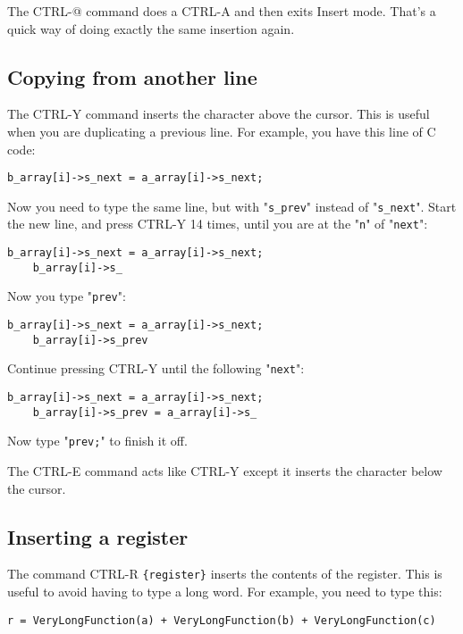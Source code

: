 The CTRL-@ command does a CTRL-A and then exits Insert mode.
That's a quick way of doing exactly the same insertion again.
\subsection{Copying from another line}
The CTRL-Y command inserts the character above the cursor.
This is useful when you are duplicating a previous line.
For example, you have this line of C code:

\begin{Verbatim}[samepage=true]
    b_array[i]->s_next = a_array[i]->s_next; 
\end{Verbatim}

Now you need to type the same line, but with "\verb!s_prev!" instead of "\verb!s_next!".
Start the new line, and press CTRL-Y 14 times, until you are at the "\verb!n!" of "\verb!next!":

\begin{Verbatim}[samepage=true]
    b_array[i]->s_next = a_array[i]->s_next; 
    b_array[i]->s_ 
\end{Verbatim}

Now you type "\verb!prev!":

\begin{Verbatim}[samepage=true]
    b_array[i]->s_next = a_array[i]->s_next; 
    b_array[i]->s_prev 
\end{Verbatim}

Continue pressing CTRL-Y until the following "\verb!next!":

\begin{Verbatim}[samepage=true]
    b_array[i]->s_next = a_array[i]->s_next; 
    b_array[i]->s_prev = a_array[i]->s_ 
\end{Verbatim}

Now type "\verb!prev;!" to finish it off.

The CTRL-E command acts like CTRL-Y except it inserts the character below the cursor.
\subsection{Inserting a register}
The command CTRL-R \verb!{register}! inserts the contents of the register.
This is useful to avoid having to type a long word.
For example, you need to type this:

\begin{Verbatim}[samepage=true]
    r = VeryLongFunction(a) + VeryLongFunction(b) + VeryLongFunction(c) 
\end{Verbatim}

